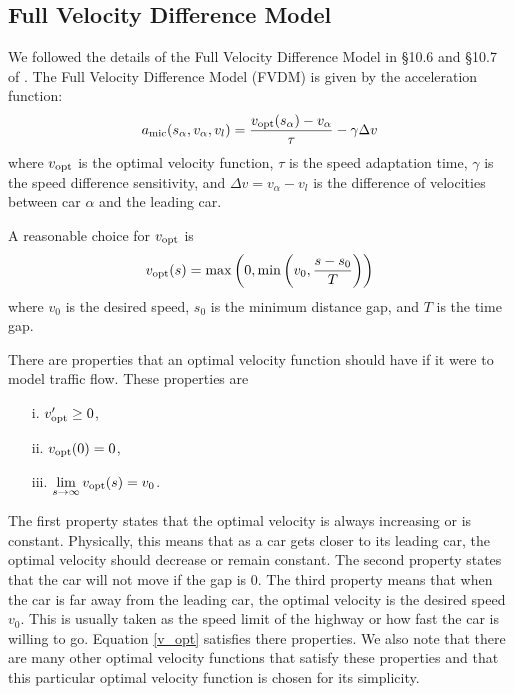 \documentclass[12pt]{article}
\begin{document}
    \subsection{Full Velocity Difference Model}\label{ch3.1}
    We followed the details of the Full Velocity Difference Model in \S 10.6 and \S 10.7 of \cite{traffic}. The Full Velocity Difference Model (FVDM) is given by the acceleration function: 
    \begin{equation}\label{a_mic}
      a_{\rm mic}(s_\alpha,v_\alpha,v_l) = \frac{v_{\rm opt} (s_\alpha) - v_\alpha}{\tau} - \gamma \Delta v 
    \end{equation}
    where $v_{\rm opt}$ is the optimal velocity function, $\tau$ is the speed adaptation time, $\gamma$ is the speed difference sensitivity, and $\Delta v = v_\alpha - v_l$ is the difference of velocities between car $\alpha$ and the leading car.
    
    A reasonable choice for $v_{\rm opt}$ is 
    \begin{equation}\label{v_opt}
      v_{\rm opt} (s) = \max \left( 0, \min \left( v_0, \frac{s-s_0}{T} \right) \right)
    \end{equation}
    where $v_0$ is the desired speed, $s_0$ is the minimum distance gap, and $T$ is the time gap. 

    There are properties that an optimal velocity function should have if it were to model traffic flow. These properties are
      
    \begin{enumerate}[leftmargin=3\parindent]
      \item[i.] $v_{\rm opt} ' \geq 0$,
      \item[ii.] $v_{\rm opt} (0) = 0$,
      \item[iii.] $\lim\limits_{s \rightarrow \infty} v_{\rm opt} (s) = v_0$. 
    \end{enumerate}
    The first property states that the optimal velocity is always increasing or is constant. Physically, this means that as a car gets closer to its leading car, the optimal velocity should decrease or remain constant. The second property states that the car will not move if the gap is $0$. The third property means that when the car is far away from the leading car, the optimal velocity is the desired speed $v_0$. This is usually taken as the speed limit of the highway or how fast the car is willing to go. Equation \ref{v_opt} satisfies there properties. We also note that there are many other optimal velocity functions that satisfy these properties and that this particular optimal velocity function is chosen for its simplicity.
    
\end{document}
